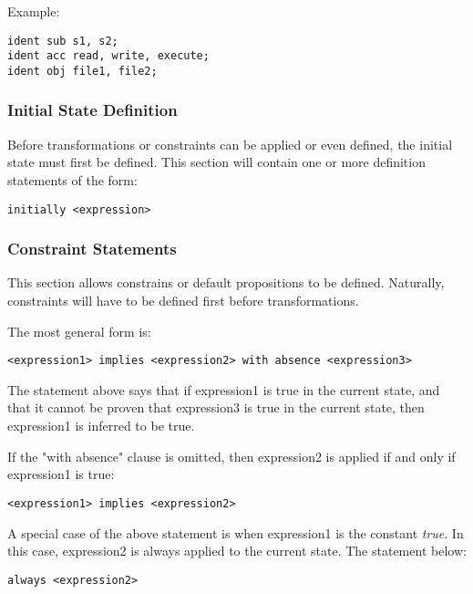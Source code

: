 \documentclass[a4paper,draft]{article}
\begin{document}
        Example:

\begin{verbatim}
ident sub s1, s2;
ident acc read, write, execute;
ident obj file1, file2;
\end{verbatim}

      \subsubsection{Initial State Definition}

        Before transformations or constraints can be applied or even defined,
        the initial state must first be defined. This section will contain
        one or more definition statements of the form:

\begin{verbatim}
initially <expression>
\end{verbatim}

      \subsubsection{Constraint Statements}

        This section allows constrains or default propositions to be defined.
        Naturally, constraints will have to be defined first before
        transformations.

        The most general form is:

\begin{verbatim}
<expression1> implies <expression2> with absence <expression3>
\end{verbatim}

        The statement above says that if expression1 is true in the current
        state, and that it cannot be proven that expression3 is true in
        the current state, then expression1 is inferred to be true.

        If the "with absence" clause is omitted, then expression2 is applied
        if and only if expression1 is true:

\begin{verbatim}
<expression1> implies <expression2>
\end{verbatim}

        A special case of the above statement is when expression1 is the
        constant \emph{true}. In this case, expression2 is always applied
        to the current state. The statement below:

\begin{verbatim}
always <expression2>
\end{verbatim}
\end{document}
